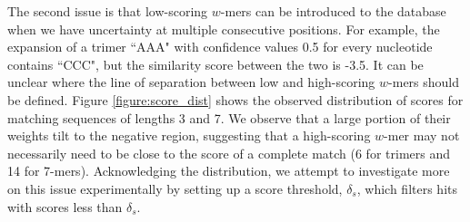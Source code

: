 \documentclass{article}
\begin{document}
The second issue is that low-scoring $w$-mers can be introduced to the database when we have uncertainty at multiple consecutive positions. For example, the expansion of a trimer ``AAA" with confidence values 0.5 for every nucleotide contains ``CCC", but the similarity score between the two is -3.5. It can be unclear where the line of separation between low and high-scoring $w$-mers should be defined. Figure \ref{figure:score_dist} shows the observed distribution of scores for matching sequences of lengths 3 and 7. We observe that a large portion of their weights tilt to the negative region, suggesting that a high-scoring $w$-mer may not necessarily need to be close to the score of a complete match (6 for trimers and 14 for 7-mers). Acknowledging the distribution, we attempt to investigate more on this issue experimentally by setting up a score threshold, $\delta_s$, which filters hits with scores less than $\delta_s$.
\end{document}

